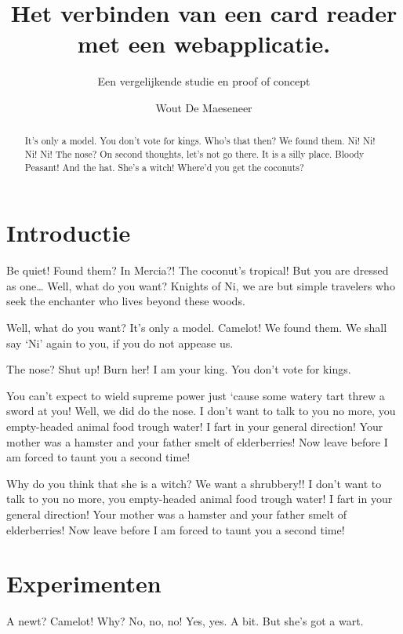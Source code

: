 \documentclass[a0,portrait]{hogent-poster}
\title{Het verbinden van een card reader met een webapplicatie.}
\subtitle{Een vergelijkende studie en proof of concept}
\author{Wout De Maeseneer}
\begin{document}
\maketitle

\begin{abstract}
It's only a model.
You don't vote for kings. Who's that then? We found them. Ni! Ni! Ni! Ni!
The nose? On second thoughts, let's not go there. It is a silly place. Bloody Peasant! And the hat. She's a witch! Where'd you get the coconuts?
\end{abstract}

\begin{multicols}{2} %

\section{Introductie}

Be quiet! Found them? In Mercia?! The coconut's tropical! But you are dressed as one… Well, what do you want? Knights of Ni, we are but simple travelers who seek the enchanter who lives beyond these woods.

Well, what do you want? It's only a model. Camelot! We found them. We shall say `Ni' again to you, if you do not appease us.

The nose? Shut up! Burn her! I am your king. You don't vote for kings.

You can't expect to wield supreme power just `cause some watery tart threw a sword at you! Well, we did do the nose. I don't want to talk to you no more, you empty-headed animal food trough water! I fart in your general direction! Your mother was a hamster and your father smelt of elderberries! Now leave before I am forced to taunt you a second time!

Why do you think that she is a witch? We want a shrubbery!! I don't want to talk to you no more, you empty-headed animal food trough water! I fart in your general direction! Your mother was a hamster and your father smelt of elderberries! Now leave before I am forced to taunt you a second time!

\section{Experimenten}

A newt? Camelot! Why? No, no, no! Yes, yes. A bit. But she's got a wart.


\end{multicols}
\end{document}
